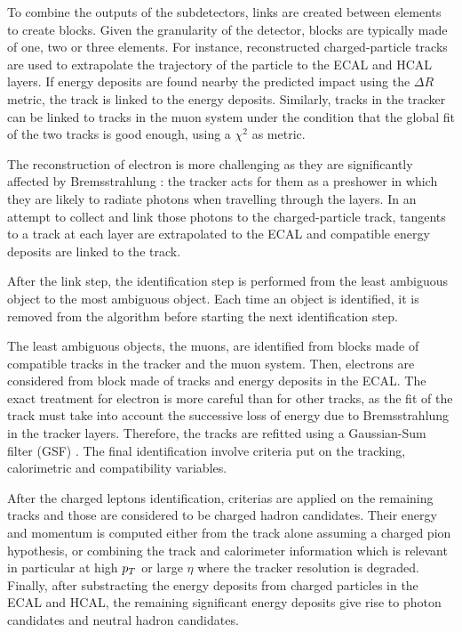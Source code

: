         To combine the outputs of the subdetectors, links are created between elements
        to create blocks. Given the granularity of the detector, blocks are typically made
        of one, two or three elements. For instance, reconstructed charged-particle tracks
        are used to extrapolate the trajectory of the particle to the ECAL and HCAL layers.
        If energy deposits are found nearby the predicted impact using the $\Delta R$
        metric, the track is linked to the energy deposits. Similarly, tracks in the
        tracker can be linked to tracks in the muon system under the condition that the
        global fit of the two tracks is good enough, using a $\chi^2$ as metric.

        The reconstruction of electron is more challenging as they are significantly
        affected by Bremsstrahlung : the tracker acts for them as a preshower in which
        they are likely to radiate photons when travelling through the layers.
        In an attempt to collect and link those photons to the charged-particle track,
        tangents to a track at each layer are extrapolated to the ECAL and compatible
        energy deposits are linked to the track.

        After the link step, the identification step is performed from the least ambiguous
        object to the most ambiguous object. Each time an object is identified, it is
        removed from the algorithm before starting the next identification step.

        The least ambiguous objects, the muons, are identified from blocks made of compatible
        tracks in the tracker and the muon system. Then, electrons are considered from
        block made of tracks and energy deposits in the ECAL. The exact treatment for
        electron is more careful than for other tracks, as the fit of the track must take
        into account the successive loss of energy due to Bremsstrahlung in the tracker
        layers. Therefore, the tracks are refitted using a Gaussian-Sum filter (GSF)
        . The final identification involve criteria put on the tracking,
        calorimetric and compatibility variables.

        After the charged leptons identification, criterias are applied on the remaining
        tracks and those are considered to be charged hadron candidates. Their energy
        and momentum is computed either from the track alone assuming a charged pion
        hypothesis, or combining the track and calorimeter information which is relevant
        in particular at high $p_T$ or large $\eta$ where the tracker resolution is
        degraded. Finally, after substracting the energy deposits from charged particles
        in the ECAL and HCAL, the remaining significant energy deposits give rise to photon
        candidates and neutral hadron candidates.


